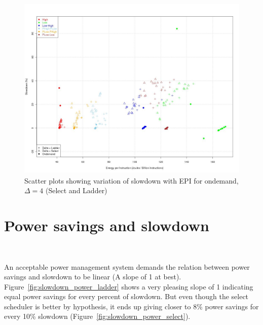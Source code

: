 \begin{figure}[h!]
  \begin{center}
    \includegraphics[height=3.5in]{figures/jpbi_vs_slowdown_delta_4.jpg}%
    \caption{Scatter plots showing variation of slowdown with EPI for ondemand, $\Delta=4$ (Select and Ladder)}
    \label{fig:jpbi_vs_slowdown}
  \end{center}
\end{figure}

\section{Power savings and slowdown}~\label{sec:pow_slow}

An acceptable power management system demands the relation between power savings and slowdown to be linear
(A slope of 1 at best). Figure~\ref{fig:slowdown_power_ladder} shows a very pleasing slope of 1 indicating 
equal power savings for every percent of slowdown. But even though the select scheduler is better by hypothesis, 
it ends up giving closer to 8\% power savings for every 10\% slowdown (Figure~\ref{fig:slowdown_power_select}). 


